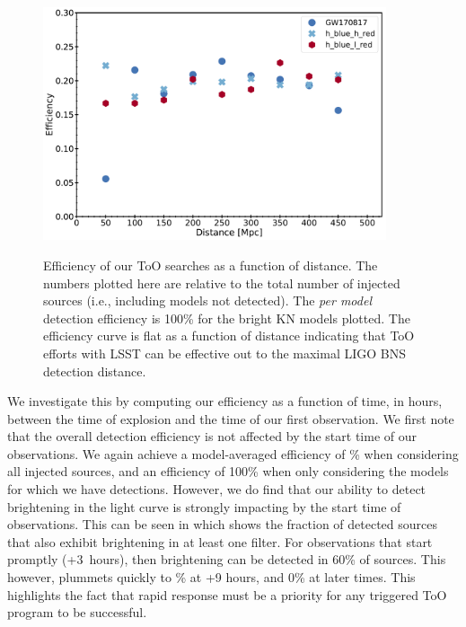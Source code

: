 \begin{figure}[!t]
\begin{center}
\hspace*{-0.1in}
\scalebox{1.}
{\includegraphics[width=0.9\textwidth]{./figs/chapter6/f5.pdf}}
\caption{\singlespace Efficiency of our ToO searches as a function of distance. The numbers plotted here are relative to the total number of injected sources (i.e., including models not detected). The {\it per model} detection efficiency is 100\% for the bright KN models plotted. The efficiency curve is flat as a function of distance indicating that ToO efforts with LSST can be effective out to the maximal LIGO BNS detection distance.}
\label{fig:ch6_snana_dist_eff}
\end{center}
\end{figure}

We investigate this by computing our efficiency as a function of time, in hours, between the time of explosion and the time of our first observation. We first note that the overall detection efficiency is not affected by the start time of our observations. We again achieve a model-averaged efficiency of \% when considering all injected sources, and an efficiency of 100\% when only considering the models for which we have detections. However, we do find that our ability to detect brightening in the light curve is strongly impacting by the start time of observations. This can be seen in  which shows the fraction of detected sources that also exhibit brightening in at least one filter. For observations that start promptly (+3~hours), then brightening can be detected in 60\% of sources. This however, plummets quickly to \% at +9 hours, and 0\% at later times. This highlights the fact that rapid response must be a priority for any triggered ToO program to be successful.

